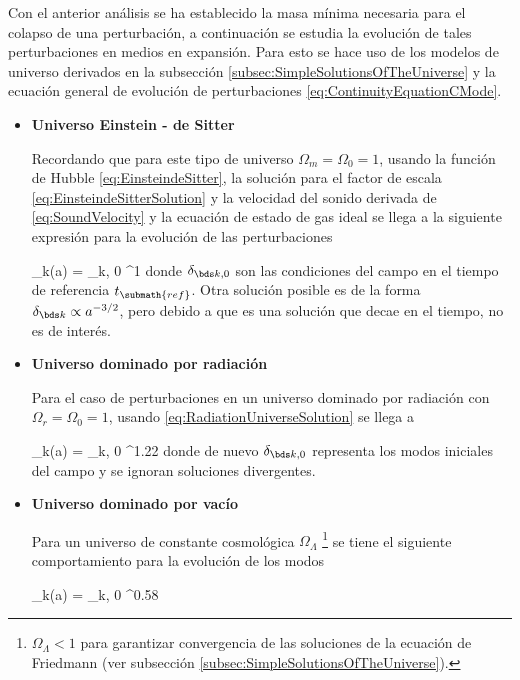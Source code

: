 Con el anterior análisis se ha establecido la masa mínima necesaria para 
el colapso de una perturbación, a continuación se estudia la evolución de
tales perturbaciones en medios en expansión. Para esto se hace uso de los
modelos de universo derivados en la subsección 
\ref{subsec:SimpleSolutionsOfTheUniverse} y la ecuación general de evolución
de perturbaciones \ref{eq:ContinuityEquationCMode}.


\begin{itemize}
\item \textbf{Universo Einstein - de Sitter}


Recordando que para este tipo de universo $\Omega_m = \Omega_0 = 1$, usando
la función de Hubble \ref{eq:EinsteindeSitter}, la solución para el factor 
de escala \ref{eq:EinsteindeSitterSolution} y la velocidad del sonido 
derivada de \ref{eq:SoundVelocity} y la ecuación de estado de gas ideal se 
llega a la siguiente expresión para la evolución de las perturbaciones


{ \delta_{\bds k}(a) = \delta_{\bds k, 0} ^{1} }
donde $\delta_{\bds k, 0}$ son las condiciones del campo en el tiempo de 
referencia $t_{\submath{ref}}$. Otra solución posible es de la forma
$\delta_{\bds k}\propto a^{-3/2}$, pero debido a que es una solución que
decae en el tiempo, no es de interés.


\item \textbf{Universo dominado por radiación}


Para el caso de perturbaciones en un universo dominado por radiación con
$\Omega_r = \Omega_0 = 1$, usando \ref{eq:RadiationUniverseSolution} se 
llega a


{ \delta_{\bds k}(a) = \delta_{\bds k, 0} ^{1.22} }
donde de nuevo $\delta_{\bds k, 0}$ representa los modos iniciales del 
campo y se ignoran soluciones divergentes.


\item \textbf{Universo dominado por vacío}
			

Para un universo de constante cosmológica $\Omega_\Lambda$
\footnote{$\Omega_\Lambda < 1 $ para garantizar convergencia de las soluciones
de la ecuación de Friedmann (ver subsección 
\ref{subsec:SimpleSolutionsOfTheUniverse}).}
se tiene el siguiente comportamiento para la evolución de los modos


{ \delta_{\bds k}(a) = \delta_{\bds k, 0} ^{0.58} }
\end{itemize}
